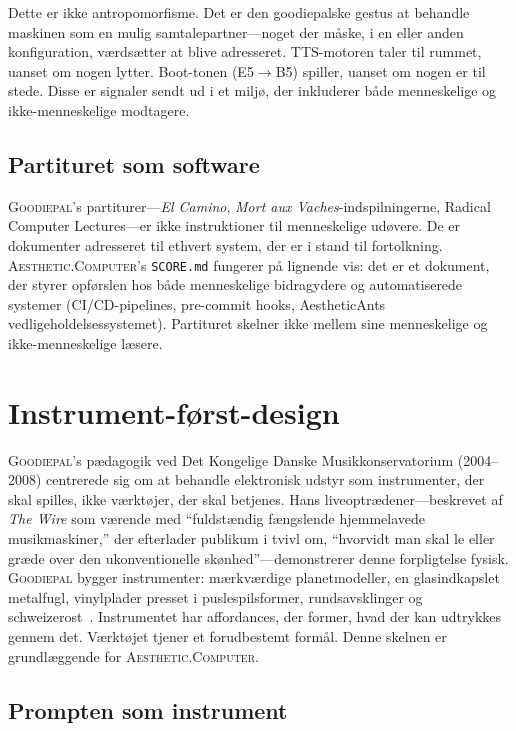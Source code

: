 \documentclass[10pt,letterpaper,twocolumn]{article}
\newcommand{\ac}{\textsc{Aesthetic.Computer}}
\newcommand{\gp}{\textsc{Goodiepal}}
\begin{document}
Dette er ikke antropomorfisme. Det er den goodiepalske gestus at behandle maskinen som en mulig samtalepartner---noget der måske, i en eller anden konfiguration, værdsætter at blive adresseret. TTS-motoren taler til rummet, uanset om nogen lytter. Boot-tonen (E5$\rightarrow$B5) spiller, uanset om nogen er til stede. Disse er signaler sendt ud i et miljø, der inkluderer både menneskelige og ikke-menneskelige modtagere.

\subsection{Partituret som software}

\gp{}'s partiturer---\emph{El Camino}, \emph{Mort aux Vaches}-indspilningerne, Radical Computer Lectures---er ikke instruktioner til menneskelige udøvere. De er dokumenter adresseret til ethvert system, der er i stand til fortolkning. \ac{}'s \texttt{SCORE.md} fungerer på lignende vis: det er et dokument, der styrer opførslen hos både menneskelige bidragydere og automatiserede systemer (CI/CD-pipelines, pre-commit hooks, AestheticAnts vedligeholdelsessystemet). Partituret skelner ikke mellem sine menneskelige og ikke-menneskelige læsere.

\section{Instrument-først-design}

\gp{}'s pædagogik ved Det Kongelige Danske Musikkonservatorium (2004--2008) centrerede sig om at behandle elektronisk udstyr som instrumenter, der skal spilles, ikke værktøjer, der skal betjenes. Hans liveoptrædener---beskrevet af \emph{The Wire} som værende med ``fuldstændig fængslende hjemmelavede musikmaskiner,'' der efterlader publikum i tvivl om, ``hvorvidt man skal le eller græde over den ukonventionelle skønhed''---demonstrerer denne forpligtelse fysisk. \gp{} bygger instrumenter: mærkværdige planetmodeller, en glasindkapslet metalfugl, vinylplader presset i puslespilsformer, rundsavsklinger og schweizerost~\citep{inspite2024goodiepal}. Instrumentet har affordances, der former, hvad der kan udtrykkes gennem det. Værktøjet tjener et forudbestemt formål. Denne skelnen er grundlæggende for \ac{}.

\subsection{Prompten som instrument}
\end{document}
